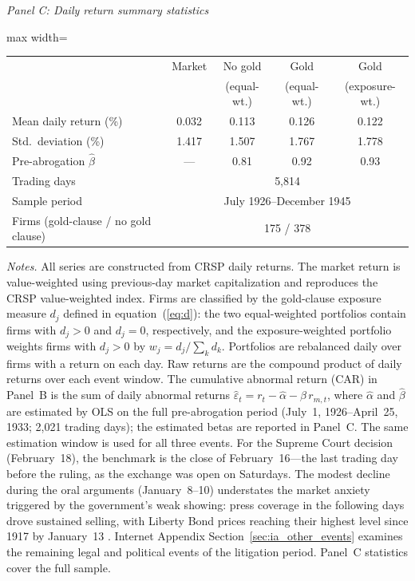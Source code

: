 \begin{table}[htbp]
\textit{Panel C: Daily return summary statistics}
\medskip
\begin{adjustbox}{max width=\textwidth}
\begin{tabular}{lcccc}
\toprule
 & Market & No gold & Gold & Gold \\
 & & (equal-wt.) & (equal-wt.) & (exposure-wt.) \\
\midrule
Mean daily return (\%) & 0.032 & 0.113 & 0.126 & 0.122 \\
Std.~deviation (\%)    & 1.417 & 1.507 & 1.767 & 1.778 \\
Pre-abrogation $\hat\beta$ & --- & 0.81 & 0.92 & 0.93 \\
Trading days            & \multicolumn{4}{c}{5,814} \\
Sample period           & \multicolumn{4}{c}{July 1926--December 1945} \\
Firms (gold-clause / no gold clause) & \multicolumn{4}{c}{175 / 378} \\
\bottomrule
\end{tabular}
\end{adjustbox}
\medskip
\begin{minipage}{0.95\textwidth}\footnotesize \textit{Notes.} All series are constructed from CRSP daily returns. The market return is value-weighted using previous-day market capitalization and reproduces the CRSP value-weighted index. Firms are classified by the gold-clause exposure measure $d_j$ defined in equation~(\ref{eq:d}): the two equal-weighted portfolios contain firms with $d_j>0$ and $d_j=0$, respectively, and the exposure-weighted portfolio weights firms with $d_j>0$ by $w_j = d_j/\sum_k d_k$. Portfolios are rebalanced daily over firms with a return on each day. Raw returns are the compound product of daily returns over each event window. The cumulative abnormal return (CAR) in Panel~B is the sum of daily abnormal returns $\hat{\varepsilon}_t = r_t - \hat{\alpha} - \hat{\beta}\, r_{m,t}$, where $\hat{\alpha}$ and $\hat{\beta}$ are estimated by OLS on the full pre-abrogation period (July~1, 1926--April~25, 1933; 2,021 trading days); the estimated betas are reported in Panel~C. The same estimation window is used for all three events. For the Supreme Court decision (February~18), the benchmark is the close of February~16---the last trading day before the ruling, as the exchange was open on Saturdays. The modest decline during the oral arguments (January~8--10) understates the market anxiety triggered by the government's weak showing: press coverage in the following days drove sustained selling, with Liberty Bond prices reaching their highest level since 1917 by January~13 \citep{NYT1935}. Internet Appendix Section~\ref{sec:ia_other_events} examines the remaining legal and political events of the litigation period. Panel~C statistics cover the full sample.\end{minipage}
\end{table}
